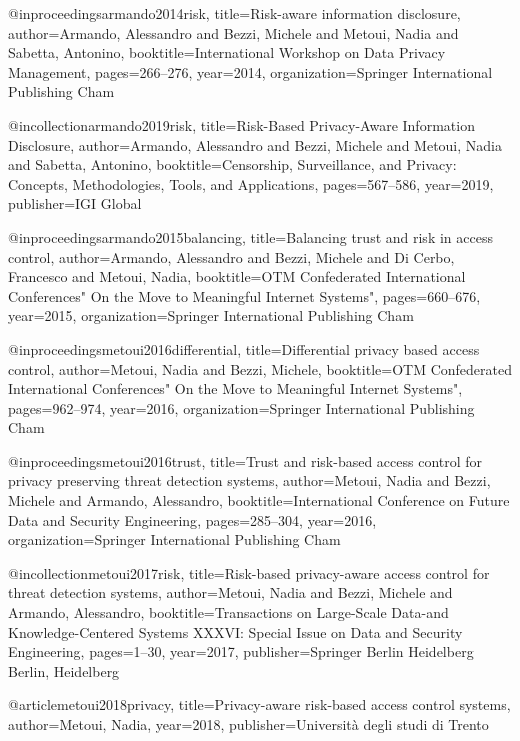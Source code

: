 @inproceedings{armando2014risk,
  title={Risk-aware information disclosure},
  author={Armando, Alessandro and Bezzi, Michele and Metoui, Nadia and Sabetta, Antonino},
  booktitle={International Workshop on Data Privacy Management},
  pages={266--276},
  year={2014},
  organization={Springer International Publishing Cham}
}

@incollection{armando2019risk,
  title={Risk-Based Privacy-Aware Information Disclosure},
  author={Armando, Alessandro and Bezzi, Michele and Metoui, Nadia and Sabetta, Antonino},
  booktitle={Censorship, Surveillance, and Privacy: Concepts, Methodologies, Tools, and Applications},
  pages={567--586},
  year={2019},
  publisher={IGI Global}
}

@inproceedings{armando2015balancing,
  title={Balancing trust and risk in access control},
  author={Armando, Alessandro and Bezzi, Michele and Di Cerbo, Francesco and Metoui, Nadia},
  booktitle={OTM Confederated International Conferences" On the Move to Meaningful Internet Systems"},
  pages={660--676},
  year={2015},
  organization={Springer International Publishing Cham}
}

@inproceedings{metoui2016differential,
  title={Differential privacy based access control},
  author={Metoui, Nadia and Bezzi, Michele},
  booktitle={OTM Confederated International Conferences" On the Move to Meaningful Internet Systems"},
  pages={962--974},
  year={2016},
  organization={Springer International Publishing Cham}
}

@inproceedings{metoui2016trust,
  title={Trust and risk-based access control for privacy preserving threat detection systems},
  author={Metoui, Nadia and Bezzi, Michele and Armando, Alessandro},
  booktitle={International Conference on Future Data and Security Engineering},
  pages={285--304},
  year={2016},
  organization={Springer International Publishing Cham}
}

@incollection{metoui2017risk,
  title={Risk-based privacy-aware access control for threat detection systems},
  author={Metoui, Nadia and Bezzi, Michele and Armando, Alessandro},
  booktitle={Transactions on Large-Scale Data-and Knowledge-Centered Systems XXXVI: Special Issue on Data and Security Engineering},
  pages={1--30},
  year={2017},
  publisher={Springer Berlin Heidelberg Berlin, Heidelberg}
}

@article{metoui2018privacy,
  title={Privacy-aware risk-based access control systems},
  author={Metoui, Nadia},
  year={2018},
  publisher={Universit{\`a} degli studi di Trento}
}

